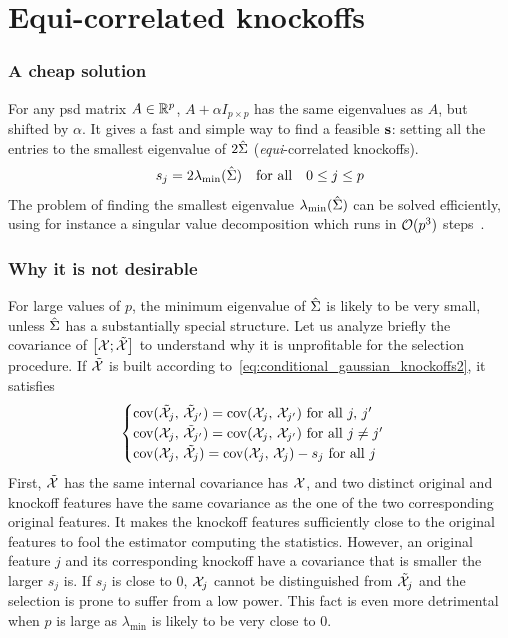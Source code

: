 \section{Equi-correlated knockoffs}\label{sec:equi}

\subsubsection{A cheap solution}

For any psd matrix $A \in \mathbb{R}^p$, $A + \alpha I_{p \times p}$ has the same eigenvalues as $A$, but shifted by $\alpha$.
It gives a fast and simple way to find a feasible $\mathbf{s}$:
setting all the entries to the smallest eigenvalue of $2\hat{\Sigma}$ (\textit{equi}-correlated knockoffs).
\begin{equation}\label{eq:equi}
    s_j = 2\lambda_{\min}(\hat{\Sigma})
    \quad\text{for all}\quad 0 \leq j \leq p
\end{equation}
The problem of finding the smallest eigenvalue $\lambda_{\min}(\hat{\Sigma})$ can be solved efficiently,
using for instance a singular value decomposition which runs in $\mathcal{O}(p^3)$ steps~\citep{svd}.

\subsubsection{Why it is not desirable}

For large values of $p$,
the minimum eigenvalue of $\hat{\Sigma}$ is likely to be very small,
unless $\hat{\Sigma}$ has a substantially special structure.
Let us analyze briefly the covariance of $\big[ \mathcal{X}; \tilde{\mathcal{X}} \big]$
to understand why it is unprofitable for the selection procedure.
If $\tilde{\mathcal{X}}$ is built according to~\ref{eq:conditional_gaussian_knockoffs2}, it satisfies
\begin{equation*}
    \begin{cases}
        \operatorname*{cov}(\tilde{\mathcal{X}}_j,\, \tilde{\mathcal{X}}_{j'}) = \operatorname*{cov}(\mathcal{X}_j,\, \mathcal{X}_{j'}) \text{ for all } j,\,j'\\
        \operatorname*{cov}(\mathcal{X}_j,\, \tilde{\mathcal{X}}_{j'}) = \operatorname*{cov}(\mathcal{X}_j,\, \mathcal{X}_{j'}) \text{ for all } j \neq j'\\
        \operatorname*{cov}(\mathcal{X}_j,\, \tilde{\mathcal{X}}_j) = \operatorname*{cov}(\mathcal{X}_j,\, \mathcal{X}_j) - s_j \text{ for all } j
    \end{cases}
\end{equation*}
First, $\tilde{\mathcal{X}}$ has the same internal covariance has $\mathcal{X}$,
and two distinct original and knockoff features have the same covariance
as the one of the two corresponding original features.
It makes the knockoff features sufficiently close to the original features
to fool the estimator computing the statistics.
However, an original feature $j$ and its corresponding knockoff have a covariance that is smaller the larger $s_j$ is.
If $s_j$ is close to $0$,
$\mathcal{X}_j$ cannot be distinguished from $\tilde{\mathcal{X}}_j$ and the selection is prone to suffer from a low power.
This fact is even more detrimental when $p$ is large as $\lambda_{\min}$ is likely to be very close to $0$.

